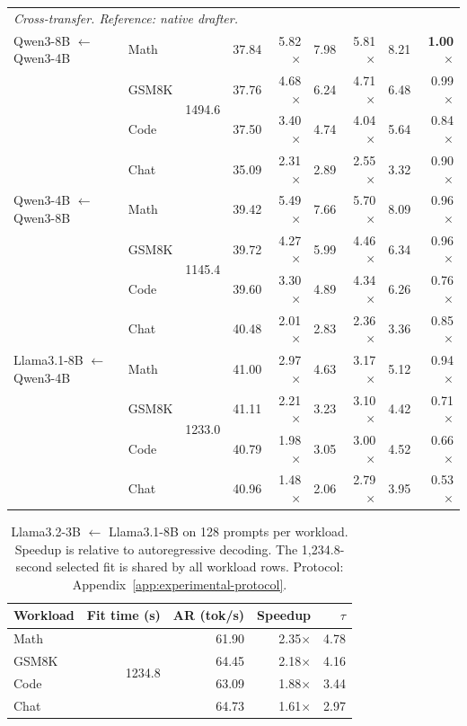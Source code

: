 \begin{table}[t]
\begin{tabular}{llrrrrrrr}
\midrule
\multicolumn{9}{l}{\emph{Cross-transfer. Reference: native drafter.}} \\
Qwen3-8B $\leftarrow$ Qwen3-4B & Math & \multirow{4}{*}{1494.6} & 37.84 & 5.82$\times$ & 7.98 & 5.81$\times$ & 8.21 & \textbf{1.00$\times$} \\
 & GSM8K & & 37.76 & 4.68$\times$ & 6.24 & 4.71$\times$ & 6.48 & 0.99$\times$ \\
 & Code & & 37.50 & 3.40$\times$ & 4.74 & 4.04$\times$ & 5.64 & 0.84$\times$ \\
 & Chat & & 35.09 & 2.31$\times$ & 2.89 & 2.55$\times$ & 3.32 & 0.90$\times$ \\
\addlinespace[1pt]
Qwen3-4B $\leftarrow$ Qwen3-8B & Math & \multirow{4}{*}{1145.4} & 39.42 & 5.49$\times$ & 7.66 & 5.70$\times$ & 8.09 & 0.96$\times$ \\
 & GSM8K & & 39.72 & 4.27$\times$ & 5.99 & 4.46$\times$ & 6.34 & 0.96$\times$ \\
 & Code & & 39.60 & 3.30$\times$ & 4.89 & 4.34$\times$ & 6.26 & 0.76$\times$ \\
 & Chat & & 40.48 & 2.01$\times$ & 2.83 & 2.36$\times$ & 3.36 & 0.85$\times$ \\
\addlinespace[1pt]
Llama3.1-8B $\leftarrow$ Qwen3-4B & Math & \multirow{4}{*}{1233.0} & 41.00 & 2.97$\times$ & 4.63 & 3.17$\times$ & 5.12 & 0.94$\times$ \\
 & GSM8K & & 41.11 & 2.21$\times$ & 3.23 & 3.10$\times$ & 4.42 & 0.71$\times$ \\
 & Code & & 40.79 & 1.98$\times$ & 3.05 & 3.00$\times$ & 4.52 & 0.66$\times$ \\
 & Chat & & 40.96 & 1.48$\times$ & 2.06 & 2.79$\times$ & 3.95 & 0.53$\times$ \\
\bottomrule
\end{tabular}
\setlength{\tabcolsep}{6pt}
\end{table}

\begin{table}[t]
\centering
\caption{Llama3.2-3B $\leftarrow$ Llama3.1-8B on 128 prompts per workload. Speedup is relative to autoregressive decoding. The 1,234.8-second selected fit is shared by all workload rows. Protocol: Appendix~\ref{app:experimental-protocol}.}
\label{tab:llama-transfer}
\small
\begin{tabular}{lrrrr}
\toprule
Workload & Fit time (s) & AR (tok/s) & Speedup & $\tau$ \\
\midrule
Math & \multirow{4}{*}{1234.8} & 61.90 & 2.35$\times$ & 4.78 \\
GSM8K & & 64.45 & 2.18$\times$ & 4.16 \\
Code & & 63.09 & 1.88$\times$ & 3.44 \\
Chat & & 64.73 & 1.61$\times$ & 2.97 \\
\bottomrule
\end{tabular}
\end{table}

